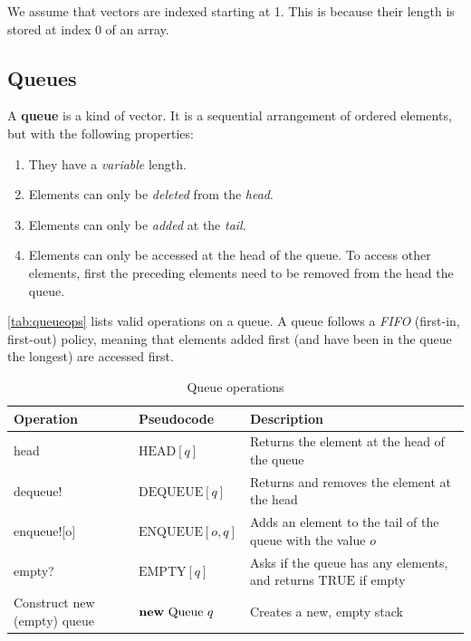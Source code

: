 We assume that vectors are indexed starting at 1. This is because their length is stored at index 0 of an array.

\subsection{Queues}
A \textbf{queue} is a kind of vector. It is a sequential arrangement of ordered elements, but with the following properties:

\begin{enumerate}
	\item They have a \emph{variable} length.
	\item Elements can only be \emph{deleted} from the \emph{head}.
	\item Elements can only be \emph{added} at the \emph{tail}.
	\item Elements can only be accessed at the head of the queue. To access other elements, first the preceding elements need to be removed from the head the queue.
	\end{enumerate}

	\autoref{tab:queueops} lists valid operations on a queue. A queue follows a \emph{FIFO} (first-in, first-out) policy, meaning that elements added first (and have been in the queue the longest) are accessed first.
\begin{table}[ht]
	\renewcommand{\arraystretch}{2}
	\centering

	\begin{tabular}{@{}ll>{\raggedright\arraybackslash}p{7cm}@{}}
	\toprule
		\textbf{Operation}  & \textbf{Pseudocode}  & \textbf{Description}  \\ \midrule
	head & \( \textrm{HEAD}[q] \) & Returns the element at the head of the queue \\
	dequeue! & \( \textrm{DEQUEUE}[q] \) & Returns and removes the element at the head\\
	enqueue![o] & \( \textrm{ENQUEUE}[o,q] \) & Adds an element to the tail of the queue with the value \( o \) \\
	empty? & \( \textrm{EMPTY}[q] \) & Asks if the queue has any elements, and returns \( \textrm{TRUE} \) if empty\\
	Construct new (empty) queue & \( \textrm{\textbf{new} Queue } q \) & Creates a new, empty stack\\ \bottomrule
	\end{tabular}
	\caption{Queue operations}\label{tab:queueops}
	\end{table}

